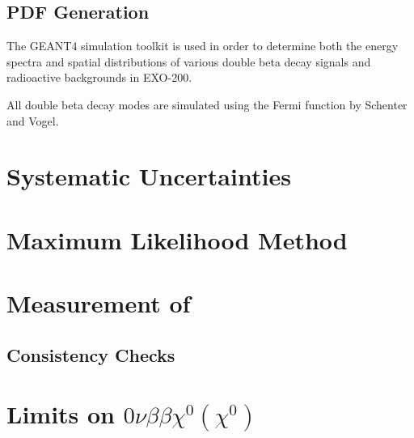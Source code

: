 \documentclass[herrin-thesis.tex]{subfiles}
\begin{document}
\subsection{PDF Generation}

The GEANT4 simulation toolkit\cite{Agostinelli:2003fk} is used in order to determine both the energy spectra and spatial distributions of various double beta decay signals and radioactive backgrounds in EXO-200.

All double beta decay modes are simulated using the Fermi function by Schenter and Vogel\cite{Schenter:1983uq}.

\section{Systematic Uncertainties}

\section{Maximum Likelihood Method}

\section{Measurement of \twonu}

\subsection{Consistency Checks}

\section{Limits on \(0\nu\beta\beta\chi^0(\chi^0)\)}
\end{document}
